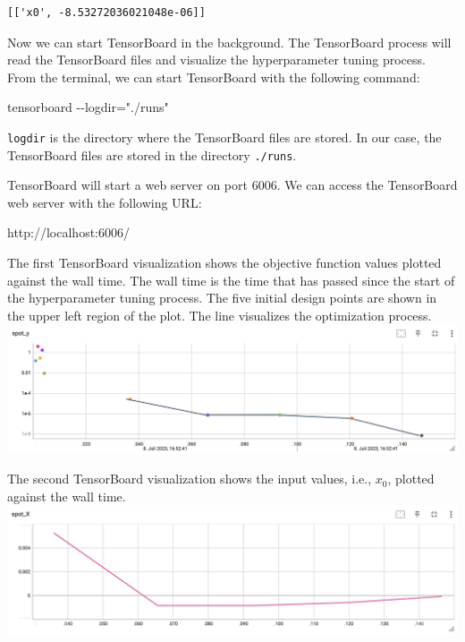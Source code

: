 \documentclass[
  letterpaper,
  DIV=11,
  numbers=noendperiod]{scrreprt}
\newenvironment{Shaded}{\begin{snugshade}}{\end{snugshade}}
\newcommand{\NormalTok}[1]{\textcolor[rgb]{0.00,0.23,0.31}{#1}}
\begin{document}
\begin{verbatim}
[['x0', -8.53272036021048e-06]]
\end{verbatim}

Now we can start TensorBoard in the background. The TensorBoard process
will read the TensorBoard files and visualize the hyperparameter tuning
process. From the terminal, we can start TensorBoard with the following
command:

\begin{Shaded}
\begin{Highlighting}[]
\NormalTok{tensorboard {-}{-}logdir="./runs"}
\end{Highlighting}
\end{Shaded}

\texttt{logdir} is the directory where the TensorBoard files are stored.
In our case, the TensorBoard files are stored in the directory
\texttt{./runs}.

TensorBoard will start a web server on port 6006. We can access the
TensorBoard web server with the following URL:

\begin{Shaded}
\begin{Highlighting}[]
\NormalTok{http://localhost:6006/}
\end{Highlighting}
\end{Shaded}

The first TensorBoard visualization shows the objective function values
plotted against the wall time. The wall time is the time that has passed
since the start of the hyperparameter tuning process. The five initial
design points are shown in the upper left region of the plot. The line
visualizes the optimization process.
\includegraphics{figures_static/01_tensorboard_01.png}

The second TensorBoard visualization shows the input values, i.e.,
\(x_0\), plotted against the wall time.
\includegraphics{figures_static/01_tensorboard_02.png}
\end{document}
